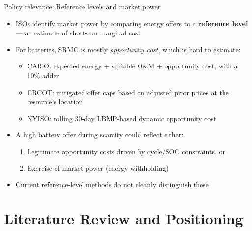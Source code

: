 \documentclass[aspectratio=169]{beamer}
\begin{document}
\begin{frame}{Policy relevance: Reference levels and market power}
\begin{itemize}
    \item ISOs identify market power by comparing energy offers to a \textbf{reference level} --- an estimate of short-run marginal cost
    \item For batteries, SRMC is mostly \textit{opportunity cost}, which is hard to estimate:
    \begin{itemize}
        \item CAISO: expected energy + variable O\&M + opportunity cost, with a 10\% adder
        \item ERCOT: mitigated offer caps based on adjusted prior prices at the resource's location
        \item NYISO: rolling 30-day LBMP-based dynamic opportunity cost
    \end{itemize}
    \pause
    \item A high battery offer during scarcity could reflect either:
    \begin{enumerate}
        \item Legitimate opportunity costs driven by cycle/SOC constraints, or
        \item Exercise of market power (energy withholding)
    \end{enumerate}
    \item Current reference-level methods do not cleanly distinguish these 

\end{itemize}
\end{frame}


\section{Literature Review and Positioning}
\end{document}
